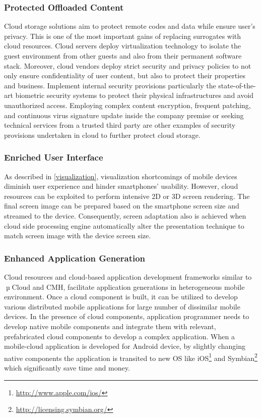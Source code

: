 \documentclass[publish]{IEEEtran}
\begin{document}
\subsubsection{Protected Offloaded Content}
Cloud storage solutions aim to protect remote codes and data while ensure user's privacy. This is one of the most important gains of replacing surrogates with cloud resources. Cloud servers deploy virtualization technology to isolate the guest environment from other guests and also from their permanent software stack. Moreover, cloud vendors deploy strict security and privacy policies to not only ensure confidentiality of user content, but also to protect their properties and business. Implement internal security provisions particularly the state-of-the-art biometric security systems to protect their physical infrastructures and avoid unauthorized access. Employing complex content encryption, frequent patching, and continuous virus signature update inside the company premise or seeking technical services from a trusted third party \cite{Yang2011a} are other examples of security provisions undertaken in cloud to further protect cloud storage.  

\subsubsection{Enriched User Interface}
As described in \ref{visualization}, visualization shortcomings of mobile devices diminish user experience and hinder smartphones' usability. However, cloud resources can be exploited to perform intensive 2D or 3D screen rendering. The final screen image can be prepared based on the smartphone screen size and streamed to the device. Consequently, screen adaptation also is achieved when cloud side processing engine automatically alter the presentation technique to match screen image with the device screen size.

\subsubsection{Enhanced Application Generation}
Cloud resources and cloud-based application development frameworks similar to $\tcmu$Cloud and CMH, facilitate application generations in heterogeneous mobile environment. Once a cloud component is built, it can be utilized to develop various distributed mobile applications for large number of dissimilar mobile devices. In the presence of cloud components, application programmer needs to develop native mobile components and integrate them with relevant, prefabricated cloud components to develop a complex application. When a mobile-cloud application is developed for Android device, by slightly changing native components the application is transited to new OS like iOS\footnote{\url{http://www.apple.com/ios/}} and Symbian\footnote{\url{http://licensing.symbian.org/}} which significantly save time and money.
\end{document}
